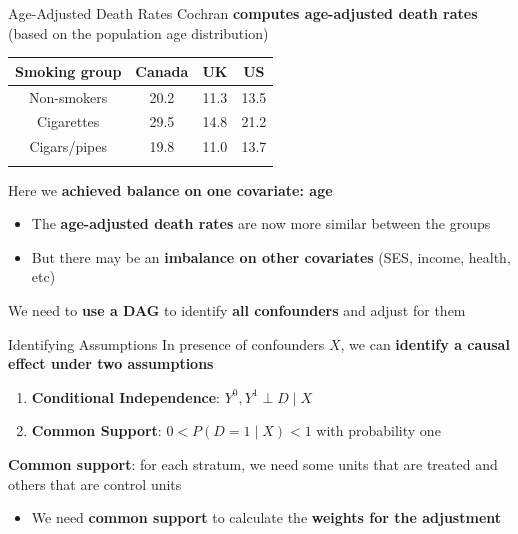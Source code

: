 \documentclass[
  ignorenonframetext,
  aspectratio=169, handout]{beamer}
\providecommand{\tightlist}{%
  \setlength{\itemsep}{0pt}\setlength{\parskip}{0pt}}
\newcommand{\brf}[1]{\textcolor{brickred}{\textbf{#1}}}
\begin{document}
\begin{frame}{Age-Adjusted Death Rates}
\protect\hypertarget{age-adjusted-death-rates}{}
Cochran \brf{computes age-adjusted death rates} (based on the population
age distribution)

\begin{longtable}[]{@{}cccc@{}}
\toprule\noalign{}
Smoking group & Canada & UK & US \\
\midrule\noalign{}
\endhead
Non-smokers & 20.2 & 11.3 & 13.5 \\
Cigarettes & 29.5 & 14.8 & 21.2 \\
Cigars/pipes & 19.8 & 11.0 & 13.7 \\
\bottomrule\noalign{}
\end{longtable}

Here we \brf{achieved balance on one covariate: age}

\begin{itemize}
\tightlist
\item
  The \textbf{age-adjusted death rates} are now more similar between the
  groups
\item
  But there may be an \textbf{imbalance on other covariates} (SES,
  income, health, etc)
\end{itemize}

\vfill

We need to \brf{use a DAG} to identify \brf{all confounders} and adjust
for them
\end{frame}

\begin{frame}{Identifying Assumptions}
\protect\hypertarget{identifying-assumptions}{}
In presence of confounders \(X\), we can
\brf{identify a causal effect under two assumptions}

\begin{enumerate}
\tightlist
\item
  \textbf{Conditional Independence}: \(Y^0, Y^1 \perp D \mid X\)
\item
  \textbf{Common Support}: \(0 < P(D = 1 \mid X) < 1\) with probability
  one
\end{enumerate}

\vfill

\brf{Common support}: for each stratum, we need some units that are
treated and others that are control units

\begin{itemize}
\tightlist
\item
  We need \textbf{common support} to calculate the \textbf{weights for
  the adjustment}
\end{itemize}
\end{frame}
\end{document}
